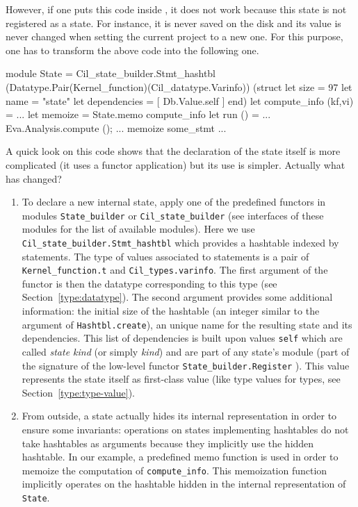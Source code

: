 However, if one puts this code inside \framac, it does not work because this
state is not registered as a \framac state. For instance, it is never saved on
the disk and its value is never changed when setting the current
project to a new one. For this purpose, one has to transform the above code into
the following one. 
 
 
 
\begin{ocamlcode}
module State =
  Cil_state_builder.Stmt_hashtbl
    (Datatype.Pair(Kernel_function)(Cil_datatype.Varinfo))
    (struct
      let size = 97
      let name = "state"
      let dependencies = [ Db.Value.self ]
     end)
let compute_info (kf,vi) = ...
let memoize = State.memo compute_info
let run () = ... Eva.Analysis.compute (); ... memoize some_stmt ...
\end{ocamlcode}
A quick look on this code shows that the declaration of the state itself is more
complicated (it uses a functor application) but its use is
simpler. Actually what has changed?
\begin{enumerate}
\item To declare a new internal state, apply one of the predefined functors in
  modules \texttt{State\_builder} or
  \texttt{Cil\_state\_builder} (see interfaces of
  these modules for the list of available modules). Here we use
  \texttt{Cil\_state\_builder.Stmt\_hashtbl} which provides a hashtable indexed
  by statements. The type of values associated to statements is a pair of
  \texttt{Kernel\_function.t} and
  \texttt{Cil\_types.varinfo}. The first argument
  of the functor is then the datatype corresponding to this type
  (see Section~\ref{type:datatype}). The second argument provides some
  additional information: the initial size of the hashtable (an
  integer similar to the argument of \texttt{Hashtbl.create}), an unique
  name for the resulting state and its
  dependencies. This list of dependencies is built
  upon values \texttt{self} which are called \emph{state
    kind} (or simply \emph{kind})
  and are part of any state's module (part of the signature of the low-level
  functor \texttt{State\_builder.Register}%
  ). This value represents the state itself
  as first-class value (like type values for \caml types, see
  Section~\ref{type:type-value}).
\item From outside, a state actually hides its internal representation in order
  to ensure some invariants: operations on states implementing hashtables do
  not take hashtables as arguments because they implicitly use the hidden
  hashtable. In our example, a predefined memo function is used in order to
  memoize the computation of \texttt{compute\_info}. This
  memoization function implicitly operates on the hashtable hidden in the
  internal representation of \texttt{State}.
\end{enumerate}

